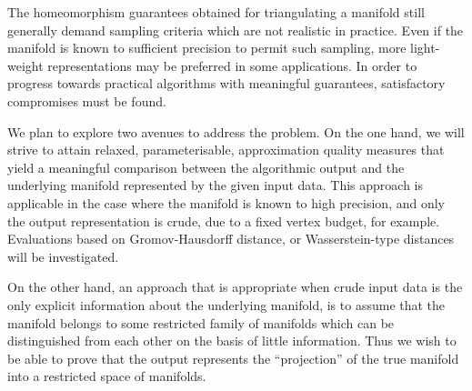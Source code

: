 The homeomorphism guarantees obtained for triangulating a manifold
still generally demand sampling criteria which are not realistic in
practice. Even if the manifold is known to sufficient precision to
permit such sampling, more light-weight representations may be
preferred in some applications.  In order to progress towards
practical algorithms with meaningful guarantees, satisfactory
compromises must be found.
%
%

We plan to explore two avenues to address the problem. On the one
hand, we will strive to attain relaxed, parameterisable, approximation
quality measures that yield a meaningful comparison between the
algorithmic output and the underlying manifold represented by the
given input data. This approach is applicable in the case where the
manifold is known to high precision, and only the output
representation is crude, due to a fixed vertex budget, for
example. Evaluations based on Gromov-Hausdorff distance,
or Wasserstein-type distances will be investigated.

On the other hand, an approach that is appropriate when crude input
data is the only explicit information about the underlying manifold,
is to assume that the manifold belongs to some restricted family of
manifolds which can be distinguished from each other on the basis of
little information. Thus we wish to be able to prove that the output
represents the ``projection'' of the true manifold into a restricted
space of manifolds.

